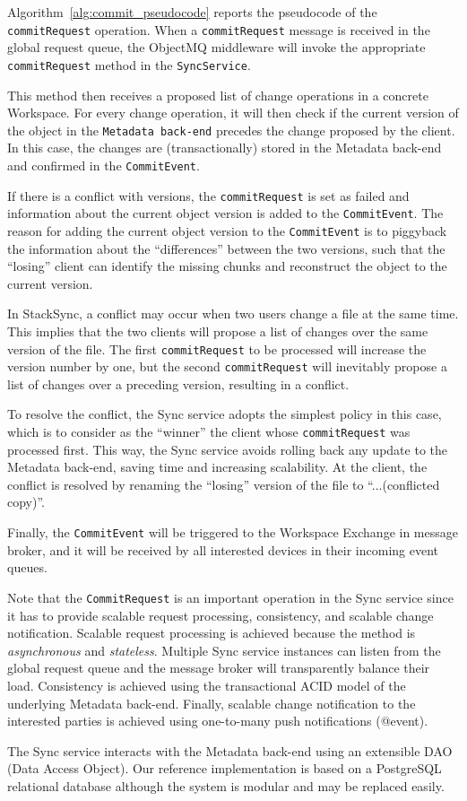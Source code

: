 Algorithm~\ref{alg:commit_pseudocode} reports the pseudocode of the \texttt{commitRequest} operation. When a \texttt{commitRequest} message is received in the global request queue, the ObjectMQ middleware will invoke the appropriate \texttt{commitRequest} method in the \texttt{SyncService}. 


This method then receives a proposed list of change operations in a concrete Workspace. For every change operation, it will then check if the current version of the object in the \texttt{Metadata back-end} precedes the change proposed by the client. In this case, the changes are (transactionally) stored in the Metadata back-end and confirmed in the \texttt{CommitEvent}. 

If there is a conflict with versions, the \texttt{commitRequest} is set as failed and information about the current object version is added to the \texttt{CommitEvent}. The reason for adding the current object version to the \texttt{CommitEvent} is to piggyback the information about the ``differences'' between the two versions, such that the ``losing'' client can identify the missing chunks and reconstruct the object to the current version. 


In StackSync, a conflict may occur when two users change a file at the same time. This implies that the two clients will propose a list of changes over the same version of the file. The first \texttt{commitRequest} to be processed will
increase the version number by one, but the second \texttt{commitRequest} will inevitably propose a list of changes over a preceding version, resulting in a conflict. 

To resolve the conflict, the Sync service adopts the simplest policy in this case, which is to consider as the ``winner''  the client whose \texttt{commitRequest} was processed first. This way, the Sync service
avoids rolling back any update to the Metadata back-end, saving time and increasing scalability. At the client,
the conflict is resolved by renaming the ``losing'' version of the file to ``...(conflicted copy)''.

Finally, the \texttt{CommitEvent} will be triggered to the Workspace Exchange in message broker, and  it will be received by all interested devices in their incoming event queues. 

Note that the \texttt{CommitRequest} is an important operation in the Sync service since it has to provide scalable request processing, consistency, and scalable change notification. Scalable request processing is achieved because the method is \textit{asynchronous} and \textit{stateless}. Multiple Sync service instances can listen from the global request queue and the message broker will transparently
balance their load. Consistency is achieved using the transactional  ACID model of the underlying Metadata back-end. 
Finally, scalable change notification to the interested parties is achieved using one-to-many push notifications (@event).

The Sync service interacts with the Metadata back-end using an extensible DAO (Data Access Object). Our reference implementation is based on a PostgreSQL relational database although the system is modular and may be replaced easily.